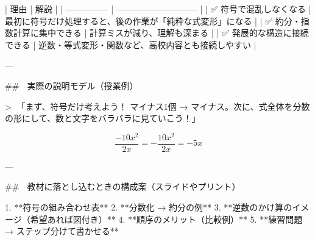 \documentclass{jsarticle}
\begin{document}
| 理由              | 解説                            |
| --------------- | ----------------------------- |
| ✅ 符号で混乱しなくなる    | 最初に符号だけ処理すると、後の作業が「純粋な式変形」になる |
| ✅ 約分・指数計算に集中できる | 計算ミスが減り、理解も深まる                |
| ✅ 発展的な構造に接続できる  | 逆数・等式変形・関数など、高校内容とも接続しやすい     |

---

## 🔷 実際の説明モデル（授業例）

> 💬「まず、符号だけ考えよう！ マイナス1個 → マイナス。次に、式全体を分数の形にして、数と文字をバラバラに見ていこう！」

$$
\frac{-10x^2}{2x} = - \frac{10x^2}{2x} = -5x
$$

---

## 🔷 教材に落とし込むときの構成案（スライドやプリント）

1. **符号の組み合わせ表**
2. **分数化 → 約分の例**
3. **逆数のかけ算のイメージ（希望あれば図付き）**
4. **順序のメリット（比較例）**
5. **練習問題 → ステップ分けて書かせる**
\end{document}
